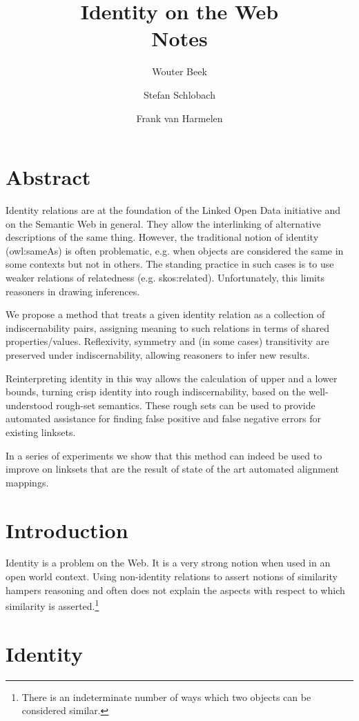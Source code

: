 \documentclass[11pt,a4paper,notitlepage,onecolumn,twoside]{article}
\title{Identity on the Web \\ Notes}
\author{Wouter Beek \and Stefan Schlobach \and Frank van Harmelen}
\begin{document}
\maketitle

\section{Abstract}

Identity relations are at the foundation of the Linked Open Data initiative and on the Semantic Web in general. They allow the interlinking of alternative descriptions of the same thing. However, the traditional notion of identity (owl:sameAs) is often problematic, e.g. when objects are considered the same in some contexts but not in others. The standing practice in such cases is to use weaker relations of relatedness (e.g. skos:related). Unfortunately, this limits reasoners in drawing inferences. 

We propose a method that treats a given identity relation as a collection of indiscernability pairs, assigning meaning to such relations in terms of shared properties/values. Reflexivity, symmetry and (in some cases) transitivity are preserved under indiscernability, allowing reasoners to infer new results.

Reinterpreting identity in this way allows the calculation of upper and a lower bounds, turning crisp identity into rough indiscernability, based on the well-understood rough-set semantics. These rough sets can be used to provide automated assistance for finding false positive and false negative errors for existing linksets.

In a series of experiments we show that this method can indeed be used to improve on linksets that are the result of state of the art automated alignment mappings.

\section{Introduction}

Identity is a problem on the Web. It is a very strong notion when used in an open world context. Using non-identity relations to assert notions of similarity hampers reasoning and often does not explain the aspects with respect to which similarity is asserted.\footnote{There is an indeterminate number of ways which two objects can be considered similar.}

\section{Identity}
\end{document}
